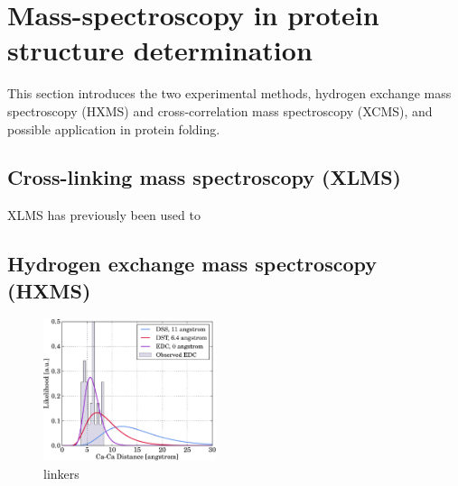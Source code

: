 \chapter{Mass-spectroscopy in protein structure determination}

This section introduces the two experimental methods, hydrogen exchange mass spectroscopy (HXMS) and cross-correlation mass spectroscopy (XCMS), and possible application in protein folding.

\section{Cross-linking mass spectroscopy (XLMS)}

XLMS has previously been used to 
\section{Hydrogen exchange mass spectroscopy (HXMS)}

\begin{figure}%
    \centering
    \includegraphics[width=0.45\textwidth]{figures/xcms/lognormal.pdf}
    \caption{linkers}
    \label{fig:linkers}%
\end{figure}






